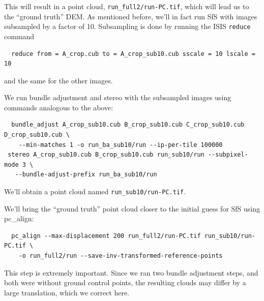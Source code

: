 This will result in a point cloud, \verb#run_full2/run-PC.tif#, which will
lead us to the ``ground truth'' DEM. As mentioned
before, we'll in fact run SfS with images subsampled by a factor of
10. Subsampling is done by running the ISIS \texttt{reduce} command
\begin{verbatim}
  reduce from = A_crop.cub to = A_crop_sub10.cub sscale = 10 lscale = 10
\end{verbatim}
and the same for the other images.

We run bundle adjustment and stereo with the subsampled images using
commands analogous to the above:
\begin{verbatim}
  bundle_adjust A_crop_sub10.cub B_crop_sub10.cub C_crop_sub10.cub D_crop_sub10.cub \
    --min-matches 1 -o run_ba_sub10/run --ip-per-tile 100000
 stereo A_crop_sub10.cub B_crop_sub10.cub run_sub10/run --subpixel-mode 3 \
   --bundle-adjust-prefix run_ba_sub10/run
\end{verbatim}
We'll obtain a point cloud named \verb#run_sub10/run-PC.tif#.

We'll bring the ``ground truth'' point cloud closer to the initial guess
for SfS using pc\_align:
\begin{verbatim}
  pc_align --max-displacement 200 run_full2/run-PC.tif run_sub10/run-PC.tif \
    -o run_full2/run --save-inv-transformed-reference-points
\end{verbatim}
This step is extremely important. Since we ran two bundle adjustment
steps, and both were without ground control points, the resulting clouds
may differ by a large translation, which we correct here.

